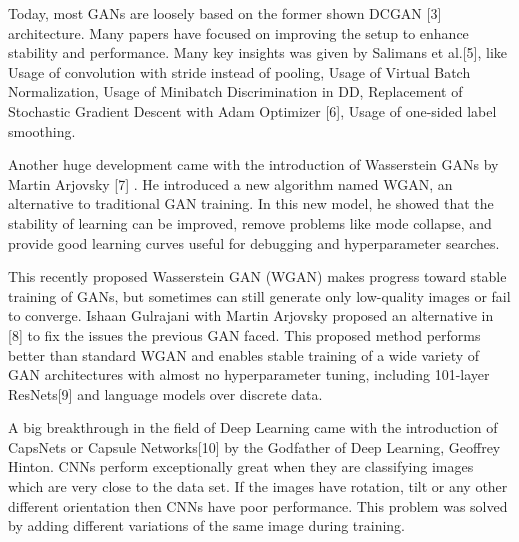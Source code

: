 Today, most GANs are loosely based on the former shown DCGAN [3] architecture. Many papers have focused on improving the setup to enhance stability and performance. Many key insights was given by Salimans et al.[5], like Usage of convolution with stride instead of pooling, Usage of Virtual Batch Normalization, Usage of Minibatch Discrimination in DD, Replacement of Stochastic Gradient Descent with Adam Optimizer [6], Usage of one-sided label smoothing.
\par\bigskip

Another huge development came with the introduction of Wasserstein GANs by Martin Arjovsky [7] . He introduced a new algorithm named WGAN, an alternative to traditional GAN training. In this new model, he showed that the stability of learning can be improved, remove problems like mode collapse, and provide good learning curves useful for debugging and hyperparameter searches.
\par\bigskip

This recently proposed Wasserstein GAN (WGAN) makes progress toward stable training of GANs, but sometimes can still generate only low-quality images or fail to converge. 
Ishaan Gulrajani with Martin Arjovsky proposed an alternative in [8] to fix the issues the previous GAN faced. This proposed method performs better than standard WGAN and enables stable training of a wide variety of GAN architectures with almost no hyperparameter tuning, including 101-layer ResNets[9] and language models over discrete data.
\par\bigskip

A big breakthrough in the field of Deep Learning came with the introduction of CapsNets or Capsule Networks[10] by the Godfather of Deep Learning, Geoffrey Hinton. CNNs perform exceptionally great when they are classifying images which are very close to the data set. If the images have rotation, tilt or any other different orientation then CNNs have poor performance. This problem was solved by adding different variations of the same image during training.
\par\bigskip